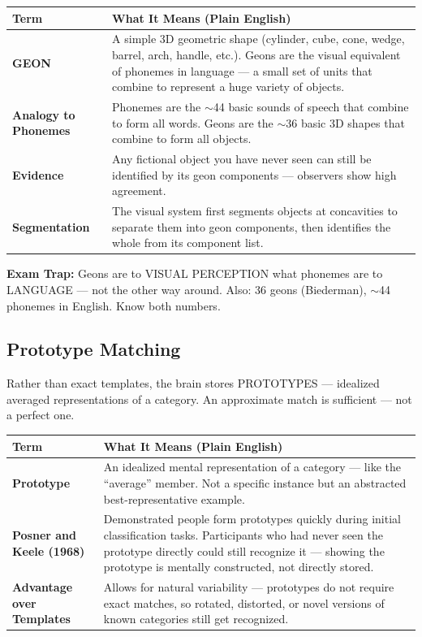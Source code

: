 \documentclass[11pt,a4paper]{article}
\newcommand{\bb}[1]{\textbf{#1}}
\begin{document}
\begin{center}
\renewcommand{\arraystretch}{1.4}
\begin{tabular}{|L{3.2cm}|L{12cm}|}
\hline
{}\color{white}\bb{Term} & \color{white}\bb{What It Means (Plain English)} \\
\hline
\bb{GEON} & A simple 3D geometric shape (cylinder, cube, cone, wedge, barrel, arch, handle, etc.). Geons are the visual equivalent of phonemes in language --- a small set of units that combine to represent a huge variety of objects. \\
\bb{Analogy to Phonemes} & Phonemes are the $\sim$44 basic sounds of speech that combine to form all words. Geons are the $\sim$36 basic 3D shapes that combine to form all objects. \\
\bb{Evidence} & Any fictional object you have never seen can still be identified by its geon components --- observers show high agreement. \\
\bb{Segmentation} & The visual system first segments objects at concavities to separate them into geon components, then identifies the whole from its component list. \\
\hline
\end{tabular}
\end{center}

\begin{warnbox}
\bb{Exam Trap:} Geons are to VISUAL PERCEPTION what phonemes are to LANGUAGE --- not the other way around. Also: 36 geons (Biederman), $\sim$44 phonemes in English. Know both numbers.
\end{warnbox}

\subsection*{Prototype Matching}

Rather than exact templates, the brain stores PROTOTYPES --- idealized averaged representations of a category. An approximate match is sufficient --- not a perfect one.

\begin{center}
\renewcommand{\arraystretch}{1.4}
\begin{tabular}{|L{3.2cm}|L{12cm}|}
\hline
{}\color{white}\bb{Term} & \color{white}\bb{What It Means (Plain English)} \\
\hline
\bb{Prototype} & An idealized mental representation of a category --- like the ``average'' member. Not a specific instance but an abstracted best-representative example. \\
\bb{Posner and Keele (1968)} & Demonstrated people form prototypes quickly during initial classification tasks. Participants who had never seen the prototype directly could still recognize it --- showing the prototype is mentally constructed, not directly stored. \\
\bb{Advantage over Templates} & Allows for natural variability --- prototypes do not require exact matches, so rotated, distorted, or novel versions of known categories still get recognized. \\
\hline
\end{tabular}
\end{center}
\newpage
\end{document}
